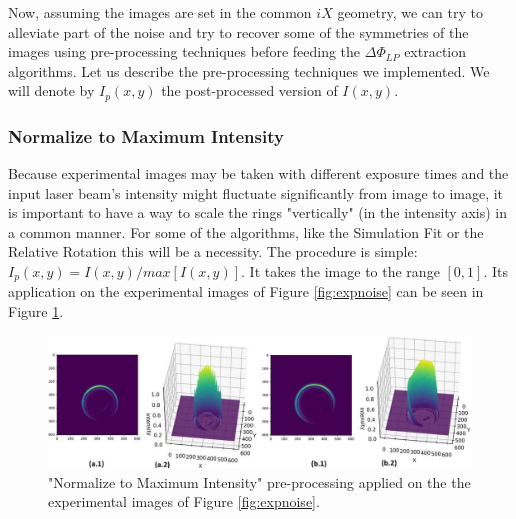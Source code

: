 \documentclass[11pt, a4paper, twoside]{article} %
\begin{document}


Now, assuming the images are set in the common $iX$ geometry, we can try to alleviate part of the noise and try to recover some of the symmetries of the images using pre-processing techniques before feeding the $\Delta \Phi_{LP}$ extraction algorithms. Let us describe the pre-processing techniques we implemented. We will denote by $I_p(x,y)$ the post-processed version of $I(x,y)$.\vspace{-0.35cm}

\subsubsection*{Normalize to Maximum Intensity}\vspace{-0.3cm}
Because experimental images may be taken with different exposure times and the input laser beam's intensity might fluctuate significantly from image to image, it is important to have a way to scale the rings "vertically" (in the intensity axis) in a common manner. For some of the algorithms, like the Simulation Fit or the Relative Rotation this will be a necessity. The procedure is simple: $I_p(x,y) = I(x,y)/max[I(x,y)]$. It takes the image to the range $[0,1]$. Its application on the experimental images of Figure \ref{fig:expnoise} can be seen in Figure \ref{fig:preprocessingMax}.\vspace{-0.3cm}


\begin{figure}[h!] 
     \centering 
    \includegraphics[width=0.9\linewidth]{max.jpg}
    \caption{"Normalize to Maximum Intensity" pre-processing applied on the the experimental images of Figure \ref{fig:expnoise}.}\vspace{-0.2cm}
    \label{fig:preprocessingMax}
\end{figure}
\end{document}
